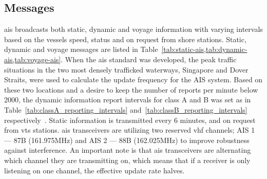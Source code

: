 \subsection{Messages}
\gls{ais} broadcasts both static, dynamic and voyage information with varying intervals based on the vessels speed, status and on request from shore stations. Static, dynamic and voyage messages are listed in Table~\cref{tab:static-ais,tab:dynamic-ais,tab:voyage-ais}. When the \gls{ais} standard was developed, the peak traffic situations in the two most densely trafficked waterways, Singapore and Dover Straits, were used to calculate the update frequency for the AIS system. Based on these two locations and a desire to keep the number of reports per minute below 2000, the dynamic information report intervals for class A and B was set as in Table~\ref{tab:classA_reporting_intervals} and~\ref{tab:classB_reporting_intervals} respectively~\cite{IALA2004}. Static information is transmitted every 6 minutes, and on request from \gls{vts} stations. \gls{ais} transceivers are utilizing two reserved \gls{vhf} channels; AIS 1 --- 87B (161.975MHz) and AIS 2 --- 88B (162.025MHz) to improve robustness against interference. An important note is that \gls{ais} transceivers are alternating which channel they are transmitting on, which means that if a receiver is only listening on one channel, the effective update rate halves.

